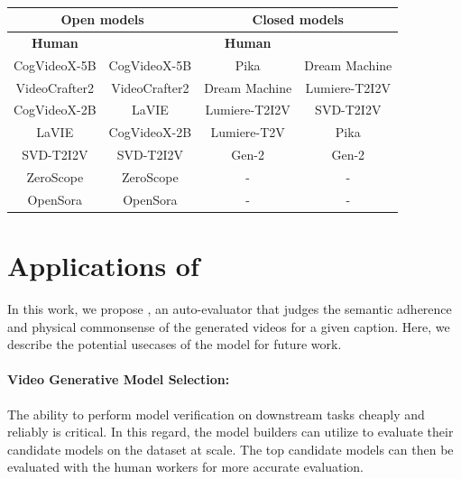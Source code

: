 \begin{table}[h]
\centering
\caption{}
\label{tab:automatic_human_leaderboard}
\begin{tabular}{cc|cc}
\hline
\multicolumn{2}{c}{\textbf{Open models}} & \multicolumn{2}{c}{\textbf{Closed models}} \\
\hline
\textbf{Human}          & \textbf{\model{}}     & \textbf{Human}           & \textbf{\model{}}       \\\hline
CogVideoX-5B   & CogVideoX-5B   & Pika            & Dream Machine   \\
VideoCrafter2  & VideoCrafter2  & Dream Machine   & Lumiere-T2I2V   \\
CogVideoX-2B   & LaVIE          & Lumiere-T2I2V   & SVD-T2I2V       \\
LaVIE          & CogVideoX-2B   &  Lumiere-T2V             & Pika     \\
SVD-T2I2V      & SVD-T2I2V      &    Gen-2  & Gen-2            \\
ZeroScope      & ZeroScope      & -     & -            \\
OpenSora       & OpenSora       & -           & - \\\hline
\end{tabular}
\end{table}


\section{Applications of \model{}}
\label{sec:discussion}

In this work, we propose \model{}, an auto-evaluator that judges the semantic adherence and physical commonsense of the generated videos for a given caption. Here, we describe the potential usecases of the model for future work.


\paragraph{Video Generative Model Selection:} The ability to perform model verification on downstream tasks cheaply and reliably is critical. In this regard, the model builders can utilize \model{} to evaluate their candidate models on the \name{} dataset at scale. The top candidate models can then be evaluated with the human workers for more accurate evaluation.  

